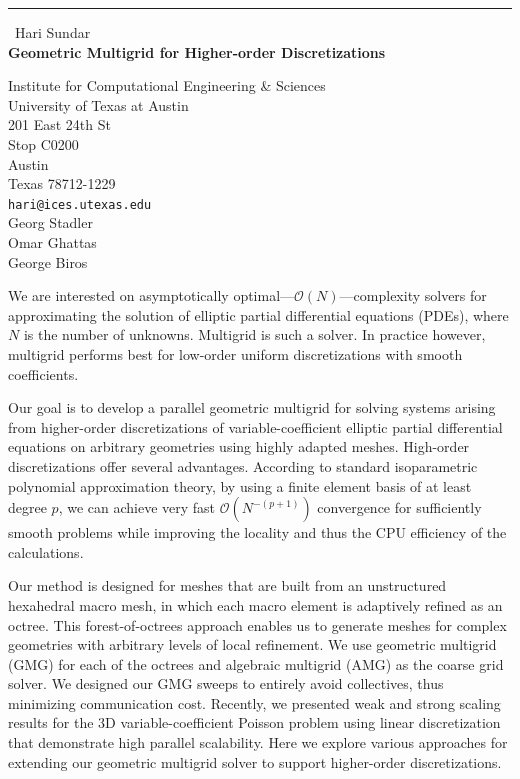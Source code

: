 \documentclass{report}
\begin{document}
\begin{center}
\rule{6in}{1pt} \
{\large Hari Sundar \\
{\bf Geometric Multigrid for Higher-order Discretizations}}

Institute for Computational Engineering & Sciences \\ University of Texas at Austin \\ 201 East 24th St \\ Stop C0200 \\ Austin \\ Texas 78712-1229
\\
{\tt hari@ices.utexas.edu}\\
Georg Stadler\\
Omar Ghattas\\
George Biros\end{center}

We are interested on asymptotically
optimal---$\mathcal{O}(N)$---complexity solvers for approximating the
solution of elliptic partial differential equations (PDEs), where $N$ is
the number of unknowns. Multigrid is such a solver. In practice however,
multigrid performs best for low-order uniform discretizations with smooth
coefficients.

Our goal is to develop a parallel geometric multigrid for solving systems
arising from higher-order discretizations of variable-coefficient
elliptic partial differential equations on arbitrary geometries using
highly adapted meshes. High-order discretizations offer several
advantages. According to standard isoparametric polynomial approximation
theory, by using a finite element basis of at least degree $p$, we can
achieve very fast $\mathcal{O}(N^{-(p+1)})$ convergence for sufficiently
smooth problems while improving the locality and thus the CPU efficiency
of the calculations.

Our method is designed for meshes that are built from an unstructured
hexahedral macro mesh, in which each macro element is adaptively refined
as an octree. This forest-of-octrees approach enables us to generate
meshes for complex geometries with arbitrary levels of local refinement.
We use geometric multigrid (GMG) for each of the octrees and algebraic
multigrid (AMG) as the coarse grid solver. We designed
our GMG sweeps to entirely avoid collectives, thus minimizing
communication cost. Recently, we presented weak and strong scaling
results for the 3D variable-coefficient Poisson problem using linear
discretization that demonstrate high parallel scalability. Here we
explore various approaches for extending our geometric multigrid solver
to support higher-order discretizations.
\end{document}
